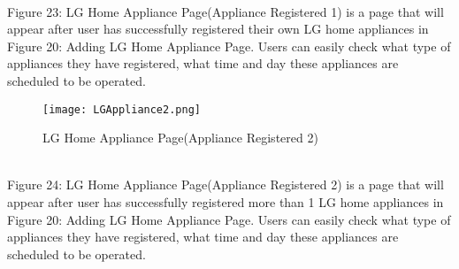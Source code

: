 \documentclass[conference]{IEEEtran}
\begin{document}
\\
\indent Figure 23: LG Home Appliance Page(Appliance Registered 1) is a page that will appear after user has successfully registered their own LG home appliances in Figure 20: Adding LG Home Appliance Page. Users can easily check what type of appliances they have registered, what time and day these appliances are scheduled to be operated.
\\
\begin{figure}[h]
\centerline{\texttt{[image: LGAppliance2.png]}}
\caption{LG Home Appliance Page(Appliance Registered 2)}
\label{fig}
\end{figure}
\\
Figure 24: LG Home Appliance Page(Appliance Registered 2) is a page that will appear after user has successfully registered more than 1 LG home appliances in Figure 20: Adding LG Home Appliance Page. Users can easily check what type of appliances they have registered, what time and day these appliances are scheduled to be operated.
\\
\end{document}
